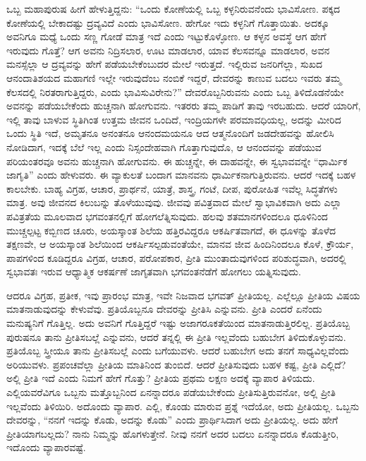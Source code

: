 ಒಬ್ಬ ಮಹಾಪುರುಷ ಹೀಗೆ ಹೇಳುತ್ತಿದ್ದನು: “ಒಂದು ಕೋಣೆಯಲ್ಲಿ ಒಬ್ಬ ಕಳ್ಳನಿರುವ\-ನೆಂದು ಭಾವಿಸೋಣ. ಪಕ್ಕದ ಕೋಣೆಯಲ್ಲಿ ಬೇಕಾದಷ್ಟು ದ್ರವ್ಯವಿದೆ ಎಂದು ಭಾವಿಸೋಣ. ಹೇಗೋ ಇದು ಕಳ್ಳನಿಗೆ ಗೊತ್ತಾಯಿತು. ಅದಕ್ಕೂ ಅವನಿಗೂ ಮಧ್ಯೆ ಒಂದು ಸಣ್ಣ ಗೋಡೆ ಮಾತ್ರ ಇದೆ ಎಂದು ಇಟ್ಟುಕೊಳ್ಳೋಣ. ಆ ಕಳ್ಳನ ಅವಸ್ಥೆ ಆಗ ಹೇಗೆ ಇರುವುದು ಗೊತ್ತೆ? ಆಗ ಅವನು ನಿದ್ರಿಸಲಾರ, ಊಟ ಮಾಡಲಾರ, ಯಾವ ಕೆಲಸವನ್ನೂ ಮಾಡಲಾರ, ಅವನ ಮನಸ್ಸೆಲ್ಲಾ ಆ ದ್ರವ್ಯವನ್ನು ಹೇಗೆ ಪಡೆಯಬೇಕೆಂಬುದರ ಮೇಲೆ ಇರುತ್ತದೆ. ಇಲ್ಲಿರುವ ಜನರಿಗೆಲ್ಲಾ, ಸುಖದ ಆನಂದಾತಿಶಯದ ಮಹಾಗಣಿ ಇಲ್ಲೇ ಇರುವುದೆಂಬ ನಂಬಿಕೆ ಇದ್ದರೆ, ದೇವರನ್ನು ಕಾಣುವ ಬದಲು ಇವರು ತಮ್ಮ ಕೆಲಸದಲ್ಲಿ ನಿರತರಾಗುತ್ತಿದ್ದರು, ಎಂದು ಭಾವಿಸುವಿರೇನು?” ದೇವರೊಬ್ಬನಿರುವನು ಎಂದು ಒಬ್ಬ ತಿಳಿದೊಡನೆಯೇ ಅವನನ್ನು ಪಡೆಯಬೇಕೆಂದು ಹುಚ್ಚನಾಗಿ ಹೋಗುವನು. ಇತರರು ತಮ್ಮ ಪಾಡಿಗೆ ತಾವು ಇರಬಹುದು. ಆದರೆ ಯಾರಿಗೆ, ಇಲ್ಲಿ ತಾವು ಬಾಳುವ ಸ್ಥಿತಿಗಿಂತ ಉತ್ತಮ ಜೀವನ ಒಂದಿದೆ, ಇಂದ್ರಿಯಗಳೇ ಪರಮಾವಧಿಯಲ್ಲ, ಅದನ್ನು ಮೀರಿದ ಒಂದು ಸ್ಥಿತಿ ಇದೆ, ಅಮೃತನೂ ಅನಂತನೂ ಆನಂದಮಯನೂ ಆದ ಆತ್ಮನೊಂದಿಗೆ ಜಡದೇಹವನ್ನು ಹೋಲಿಸಿ ನೋಡಿದಾಗ, ಇದಕ್ಕೆ ಬೆಲೆ ಇಲ್ಲ ಎಂದು ನಿಸ್ಸಂದೇಹವಾಗಿ ಗೊತ್ತಾಗುವುದೊ, ಆ ಆನಂದವನ್ನು ಪಡೆಯುವ ಪರಿಯಂತರವೂ ಅವನು ಹುಚ್ಚನಾಗಿ ಹೋಗುವನು. ಈ ಹುಚ್ಚನ್ನೇ, ಈ ದಾಹವನ್ನೇ, ಈ ಸ್ವಭಾವವನ್ನೇ “ಧಾರ್ಮಿಕ ಜಾಗೃತಿ” ಎಂದು ಹೇಳುವರು. ಈ ವ್ಯಾಕುಲತೆ ಬಂದಾಗ ಮಾನವನು ಧಾರ್ಮಿಕನಾಗುತ್ತಿರುವನು. ಆದರೆ ಇದಕ್ಕೆ ಬಹಳ ಕಾಲಬೇಕು. ಬಾಹ್ಯ ವಿಗ್ರಹ, ಆಚಾರ, ಪ್ರಾರ್ಥನೆ, ಯಾತ್ರೆ, ಶಾಸ್ತ್ರ, ಗಂಟೆ, ದೀಪ, ಪುರೋಹಿತ ಇವೆಲ್ಲ ಸಿದ್ಧತೆಗಳು ಮಾತ್ರ. ಅವು ಜೀವನದ ಕಿಲುಬನ್ನು ತೊಳೆಯುವುವು. ಜೀವವು ಪವಿತ್ರವಾದ ಮೇಲೆ ಸ್ವಾಭಾವಿಕವಾಗಿ ಅದು ಎಲ್ಲಾ ಪವಿತ್ರತೆಯ ಮೂಲವಾದ \-ಭಗವಂತನಲ್ಲಿಗೆ ಹೋಗಲೆತ್ನಿಸುವುದು. ಹಲವು ಶತಮಾನಗಳಿಂದಲೂ ಧೂಳಿನಿಂದ ಮುಚ್ಚಲ್ಪಟ್ಟ ಕಬ್ಬಿಣದ ಚೂರು, ಅಯಸ್ಕಾಂತ ಶಿಲೆಯ ಹತ್ತಿರವಿದ್ದರೂ ಆಕರ್ಷಿತವಾಗದೆ, ಈ ಧೂಳನ್ನು ತೊಳೆದ ತಕ್ಷಣವೇ, ಆ ಅಯಸ್ಕಾಂತ ಶಿಲೆಯಿಂದ ಆಕರ್ಷಿಸಲ್ಪಡುವಂತೆಯೇ, ಮಾನವ ಜೀವ ಹಿಂದಿನಿಂದಲೂ ಕೊಳೆ, ಕ್ರೌರ್ಯ, ಪಾಪಗಳಿಂದ ಕೂಡಿದ್ದರೂ ವಿಗ್ರಹ, ಆಚಾರ, ಪರೋಪಕಾರ, ಪ್ರೀತಿ ಮುಂತಾದುವುಗಳಿಂದ ಪರಿಶುದ್ಧವಾಗಿ, ಅದರಲ್ಲಿ ಸ್ವಭಾವತಃ ಇರುವ ಆಧ್ಯಾತ್ಮಿಕ ಆಕರ್ಷಣೆ ಜಾಗೃತವಾಗಿ ಭಗವಂತನೆಡೆಗೆ ಹೋಗಲು ಯತ್ನಿಸುವುದು.

ಆದರೂ ವಿಗ್ರಹ, ಪ್ರತೀಕ, ಇವು ಪ್ರಾರಂಭ ಮಾತ್ರ, ಇವೇ ನಿಜವಾದ ಭಗವತ್​ ಪ್ರೀತಿಯಲ್ಲ. ಎಲ್ಲೆಲ್ಲೂ ಪ್ರೀತಿಯ ವಿಷಯ ಮಾತನಾಡುವುದನ್ನು ಕೇಳುವೆವು. ಪ್ರತಿಯೊಬ್ಬನೂ ದೇವರನ್ನು ಪ್ರೀತಿಸಿ ಎನ್ನುವನು. ಪ್ರೀತಿ ಎಂದರೆ ಏನೆಂದು ಮನುಷ್ಯನಿಗೆ ಗೊತ್ತಿಲ್ಲ. ಅದು ಅವನಿಗೆ ಗೊತ್ತಿದ್ದರೆ ಇಷ್ಟು ಅಜಾಗರೂಕತೆಯಿಂದ ಮಾತನಾಡುತ್ತಿರಲಿಲ್ಲ. ಪ್ರತಿಯೊಬ್ಬ ಪುರುಷನೂ ತಾನು ಪ್ರೀತಿಸಬಲ್ಲೆ ಎನ್ನುವನು, ಆದರೆ ತನ್ನಲ್ಲಿ ಈ ಪ್ರೀತಿ ಇಲ್ಲವೆಂದು ಬಹುಬೇಗ ತಿಳಿದುಕೊಳ್ಳುವನು. ಪ್ರತಿಯೊಬ್ಬ ಸ್ತ್ರೀಯೂ ತಾನು ಪ್ರೀತಿಸಬಲ್ಲೆ ಎಂದು ಬಗೆಯುವಳು. ಆದರೆ ಬಹುಬೇಗ ಅದು ತನಗೆ ಸಾಧ್ಯವಿಲ್ಲವೆಂದು ಅರಿಯುವಳು. ಪ್ರಪಂಚವೆಲ್ಲಾ ಪ್ರೀತಿಯ ಮಾತಿನಿಂದ ತುಂಬಿದೆ. ಆದರೆ ಪ್ರೀತಿಸುವುದು ಬಹಳ ಕಷ್ಟ, ಪ್ರೀತಿ ಎಲ್ಲಿದೆ? ಅಲ್ಲಿ ಪ್ರೀತಿ ಇದೆ ಎಂದು ನಿಮಗೆ ಹೇಗೆ ಗೊತ್ತು? ಪ್ರೀತಿಯ ಪ್ರಥಮ ಲಕ್ಷಣ ಅದಕ್ಕೆ ವ್ಯಾಪಾರ ತಿಳಿಯದು. ಎಲ್ಲಿಯವರೆವಿಗೂ ಒಬ್ಬನು ಮತ್ತೊಬ್ಬನಿಂದ ಏನನ್ನಾದರೂ ಪಡೆಯಬೇಕೆಂದು ಪ್ರೀತಿಸುತ್ತಿರುವನೋ, ಅಲ್ಲಿ ಪ್ರೀತಿ ಇಲ್ಲವೆಂದು ತಿಳಿಯಿರಿ. ಅದೊಂದು ವ್ಯಾಪಾರ. ಎಲ್ಲಿ, ಕೊಂಡು ಮಾರುವ ಪ್ರಶ್ನೆ ಇದೆಯೋ, ಅದು ಪ್ರೀತಿಯಲ್ಲ. ಒಬ್ಬನು ದೇವರನ್ನು, “ನನಗೆ ಇದನ್ನು ಕೊಡು, ಅದನ್ನು ಕೊಡು” ಎಂದು ಪ್ರಾರ್ಥಿಸಿದಾಗ ಅದು ಪ್ರೀತಿಯಲ್ಲ. ಅದು ಹೇಗೆ ಪ್ರೀತಿಯಾಗಬಲ್ಲದು? ನಾನು ನಿಮ್ಮನ್ನು ಹೊಗಳುತ್ತೇನೆ. ನೀವು ನನಗೆ ಅದರ ಬದಲು ಏನನ್ನಾದರೂ ಕೊಡುತ್ತೀರಿ, ಇದೊಂದು ವ್ಯಾಪಾರವಷ್ಟೆ.

